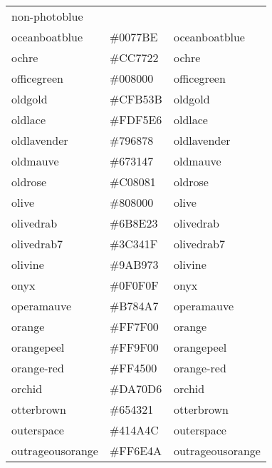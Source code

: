 \documentclass[
]{article}
\begin{document}
\begin{longtable}[]{@{}lll@{}}
\textcolor[rgb]{0.64,0.87,0.93}{non-photoblue         }\tabularnewline
oceanboatblue & \colorbox[rgb]{0.0,0.47,0.75}{\#0077BE} &
\textcolor[rgb]{0.0,0.47,0.75}{oceanboatblue         }\tabularnewline
ochre & \colorbox[rgb]{0.8,0.47,0.13}{\#CC7722} &
\textcolor[rgb]{0.8,0.47,0.13}{ochre                 }\tabularnewline
officegreen & \colorbox[rgb]{0.0,0.5,0.0}{\#008000} &
\textcolor[rgb]{0.0,0.5,0.0}{officegreen           }\tabularnewline
oldgold & \colorbox[rgb]{0.81,0.71,0.23}{\#CFB53B} &
\textcolor[rgb]{0.81,0.71,0.23}{oldgold               }\tabularnewline
oldlace & \colorbox[rgb]{0.99,0.96,0.9}{\#FDF5E6} &
\textcolor[rgb]{0.99,0.96,0.9}{oldlace               }\tabularnewline
oldlavender & \colorbox[rgb]{0.47,0.41,0.47}{\#796878} &
\textcolor[rgb]{0.47,0.41,0.47}{oldlavender           }\tabularnewline
oldmauve & \colorbox[rgb]{0.4,0.19,0.28}{\#673147} &
\textcolor[rgb]{0.4,0.19,0.28}{oldmauve              }\tabularnewline
oldrose & \colorbox[rgb]{0.75,0.5,0.51}{\#C08081} &
\textcolor[rgb]{0.75,0.5,0.51}{oldrose               }\tabularnewline
olive & \colorbox[rgb]{0.5,0.5,0.0}{\#808000} &
\textcolor[rgb]{0.5,0.5,0.0}{olive                 }\tabularnewline
olivedrab & \colorbox[rgb]{0.42,0.56,0.14}{\#6B8E23} &
\textcolor[rgb]{0.42,0.56,0.14}{olivedrab             }\tabularnewline
olivedrab7 & \colorbox[rgb]{0.24,0.2,0.12}{\#3C341F} &
\textcolor[rgb]{0.24,0.2,0.12}{olivedrab7            }\tabularnewline
olivine & \colorbox[rgb]{0.6,0.73,0.45}{\#9AB973} &
\textcolor[rgb]{0.6,0.73,0.45}{olivine               }\tabularnewline
onyx & \colorbox[rgb]{0.06,0.06,0.06}{\#0F0F0F} &
\textcolor[rgb]{0.06,0.06,0.06}{onyx                  }\tabularnewline
operamauve & \colorbox[rgb]{0.72,0.52,0.65}{\#B784A7} &
\textcolor[rgb]{0.72,0.52,0.65}{operamauve            }\tabularnewline
orange & \colorbox[rgb]{1.0,0.5,0.0}{\#FF7F00} &
\textcolor[rgb]{1.0,0.5,0.0}{orange                }\tabularnewline
orangepeel & \colorbox[rgb]{1.0,0.62,0.0}{\#FF9F00} &
\textcolor[rgb]{1.0,0.62,0.0}{orangepeel            }\tabularnewline
orange-red & \colorbox[rgb]{1.0,0.27,0.0}{\#FF4500} &
\textcolor[rgb]{1.0,0.27,0.0}{orange-red            }\tabularnewline
orchid & \colorbox[rgb]{0.85,0.44,0.84}{\#DA70D6} &
\textcolor[rgb]{0.85,0.44,0.84}{orchid                }\tabularnewline
otterbrown & \colorbox[rgb]{0.4,0.26,0.13}{\#654321} &
\textcolor[rgb]{0.4,0.26,0.13}{otterbrown            }\tabularnewline
outerspace & \colorbox[rgb]{0.25,0.29,0.3}{\#414A4C} &
\textcolor[rgb]{0.25,0.29,0.3}{outerspace            }\tabularnewline
outrageousorange & \colorbox[rgb]{1.0,0.43,0.29}{\#FF6E4A} &
\textcolor[rgb]{1.0,0.43,0.29}{outrageousorange      }\tabularnewline

\end{longtable}
\end{document}
